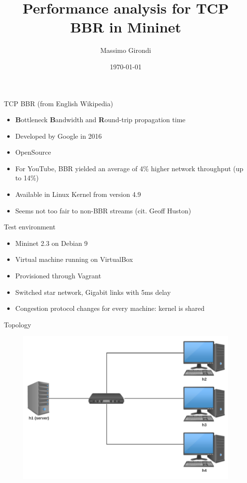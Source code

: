 \documentclass[13pt,aspectratio=43]{beamer}
\title{
	Performance analysis for TCP BBR in Mininet
}
\date{\today}
\author{Massimo Girondi}
\begin{document}
\maketitle

\begin{frame}{TCP BBR (from English Wikipedia)}
	\begin{itemize}
		\item \textbf{B}ottleneck \textbf{B}andwidth and \textbf{R}ound-trip propagation time
		\item Developed by Google in 2016
		\item OpenSource
		\item For YouTube, BBR yielded an average of 4\% higher network throughput (up to 14\%)
		\item Available in Linux Kernel from version 4.9
		\item Seems not too fair to non-BBR streams (cit. Geoff Huston)
	\end{itemize}
\end{frame}

\begin{frame}{Test environment}
	\begin{itemize}
		\item Mininet 2.3 on Debian 9
		\item Virtual machine running on VirtualBox
		\item Provisioned through Vagrant 
		\item Switched star network, Gigabit links with 5ms delay
		\item Congestion protocol changes for every machine: kernel is shared
	\end{itemize}
\end{frame}
\begin{frame}{Topology}
  \begin{figure}
	  \includegraphics[width=\textwidth,height=\textheight,keepaspectratio]{network.pdf}
  \end{figure}
\end{frame}
\end{document}
